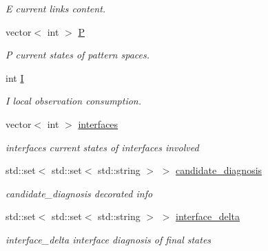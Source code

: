 \begin{DoxyCompactItemize}
\begin{DoxyCompactList}\small\item\em E current links content. \end{DoxyCompactList}\item 
vector$<$ int $>$ \hyperlink{class_behavior_state_a18d6eb62b3da1d8ed7c81d8c046367dc}{P}\hypertarget{class_behavior_state_a18d6eb62b3da1d8ed7c81d8c046367dc}{}\label{class_behavior_state_a18d6eb62b3da1d8ed7c81d8c046367dc}

\begin{DoxyCompactList}\small\item\em P current states of pattern spaces. \end{DoxyCompactList}\item 
int \hyperlink{class_behavior_state_aab20fbe5340b7df781fec9dc7c45d3f9}{I}\hypertarget{class_behavior_state_aab20fbe5340b7df781fec9dc7c45d3f9}{}\label{class_behavior_state_aab20fbe5340b7df781fec9dc7c45d3f9}

\begin{DoxyCompactList}\small\item\em I local observation consumption. \end{DoxyCompactList}\item 
vector$<$ int $>$ \hyperlink{class_behavior_state_a2e524a6ce5eb42e0947e413f611bd639}{interfaces}\hypertarget{class_behavior_state_a2e524a6ce5eb42e0947e413f611bd639}{}\label{class_behavior_state_a2e524a6ce5eb42e0947e413f611bd639}

\begin{DoxyCompactList}\small\item\em interfaces current states of interfaces involved \end{DoxyCompactList}\item 
std\+::set$<$ std\+::set$<$ std\+::string $>$ $>$ \hyperlink{class_behavior_state_a6657360daba04686e59c2541d12d873a}{candidate\+\_\+diagnosis}\hypertarget{class_behavior_state_a6657360daba04686e59c2541d12d873a}{}\label{class_behavior_state_a6657360daba04686e59c2541d12d873a}

\begin{DoxyCompactList}\small\item\em candidate\+\_\+diagnosis decorated info \end{DoxyCompactList}\item 
std\+::set$<$ std\+::set$<$ std\+::string $>$ $>$ \hyperlink{class_behavior_state_a4264f162a714acabbfeb048e68fe5885}{interface\+\_\+delta}\hypertarget{class_behavior_state_a4264f162a714acabbfeb048e68fe5885}{}\label{class_behavior_state_a4264f162a714acabbfeb048e68fe5885}

\begin{DoxyCompactList}\small\item\em interface\+\_\+delta interface diagnosis of final states \end{DoxyCompactList}\end{DoxyCompactItemize}


